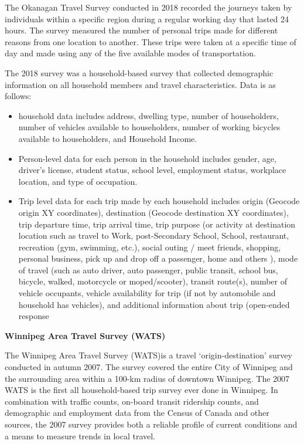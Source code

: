 \documentclass[
11pt, %
oneside, %
english, %
singlespacing, %
]{macthesis} %
\begin{document}
The Okanagan Travel Survey conducted in 2018 recorded the journeys taken by individuals within a specific region during a regular working day that lasted 24 hours. The survey measured the number of personal trips made for different reasons from one location to another. These trips were taken at a specific time of day and made using any of the five available modes of transportation.

The 2018 survey was a household-based survey that collected demographic information on all household members and travel characteristics. Data is as follows:

\begin{itemize}
\item
  household data includes address, dwelling type, number of householders, number of vehicles available to householders, number of working bicycles available to householders, and Household Income.
\item
  Person-level data for each person in the household includes gender, age, driver's license, student status, school level, employment status, workplace location, and type of occupation.
\item
  Trip level data for each trip made by each household includes origin (Geocode origin XY coordinates), destination (Geocode destination XY coordinates), trip departure time, trip arrival time, trip purpose (or activity at destination location such as travel to Work, post-Secondary School, School, restaurant, recreation (gym, swimming, etc.), social outing / meet friends, shopping, personal business, pick up and drop off a passenger, home and others ), mode of travel (such as auto driver, auto passenger, public transit, school bus, bicycle, walked, motorcycle or moped/scooter), transit route(s), number of vehicle occupants, vehicle availability for trip (if not by automobile and household has vehicles), and additional information about trip (open-ended response
\end{itemize}

\textbf{Winnipeg Area Travel Survey (WATS)}

The Winnipeg Area Travel Survey (WATS)is a travel `origin-destination' survey conducted in autumn 2007. The survey covered the entire City of Winnipeg and the surrounding area within a 100-km radius of downtown Winnipeg. The 2007 WATS is the first all household-based trip survey ever done in Winnipeg. In combination with traffic counts, on-board transit ridership counts, and demographic and employment data from the Census of Canada and other sources, the 2007 survey provides both a reliable profile of current conditions and a means to measure trends in local travel.
\end{document}
